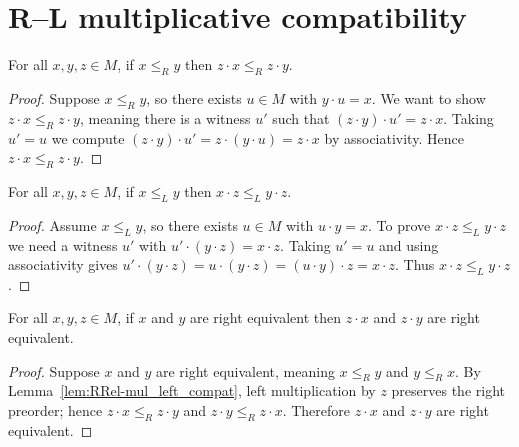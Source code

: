 \section{R--L multiplicative compatibility}

\begin{lemma}
\label{lem:RRel-mul_left_compat}
For all \(x,y,z \in M\), if \(x \le_R y\) then \(z\cdot x \le_R z\cdot y\).
\leanok
{}
\end{lemma}
\begin{proof}
\leanok
Suppose \(x \le_R y\), so there exists \(u\in M\) with \(y \cdot u = x\).  We want to show \(z\cdot x \le_R z\cdot y\), meaning there is a witness \(u'\) such that \((z\cdot y)\cdot u' = z\cdot x\).  Taking \(u' = u\) we compute \((z\cdot y)\cdot u' = z\cdot(y\cdot u) = z\cdot x\) by associativity.  Hence \(z\cdot x \le_R z\cdot y\).
\end{proof}

\begin{lemma}
\label{lem:LRel-mul_right_compat}
For all \(x,y,z \in M\), if \(x \le_L y\) then \(x\cdot z \le_L y\cdot z\).
\leanok
{}
\end{lemma}
\begin{proof}
\leanok
Assume \(x \le_L y\), so there exists \(u \in M\) with \(u\cdot y = x\).  To prove \(x\cdot z \le_L y\cdot z\) we need a witness \(u'\) with \(u'\cdot (y\cdot z) = x\cdot z\).  Taking \(u'=u\) and using associativity gives \(u'\cdot (y\cdot z) = u\cdot (y\cdot z) = (u\cdot y)\cdot z = x\cdot z\).  Thus \(x\cdot z \le_L y\cdot z\).
\end{proof}

\begin{lemma}
\label{lem:REquiv-mul_left_compat}
For all \(x,y,z\in M\), if \(x\) and \(y\) are right equivalent then \(z\cdot x\) and \(z\cdot y\) are right equivalent.
\leanok
{}
\end{lemma}
\begin{proof}
\leanok
Suppose \(x\) and \(y\) are right equivalent, meaning \(x \le_R y\) and \(y \le_R x\).  By Lemma~\ref{lem:RRel-mul_left_compat}, left multiplication by \(z\) preserves the right preorder; hence \(z\cdot x \le_R z\cdot y\) and \(z\cdot y \le_R z\cdot x\).  Therefore \(z\cdot x\) and \(z\cdot y\) are right equivalent.
\end{proof}

